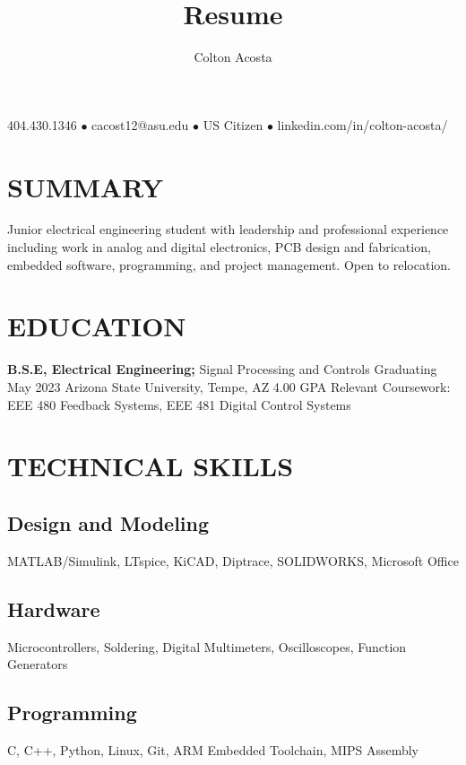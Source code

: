 \documentclass{article}
\makeatletter
\renewcommand{\maketitle}{
	\begin{center}
		{\huge\bfseries
			\theauthor}
			
		404.430.1346 $\bullet$ cacost12@asu.edu $\bullet$ US Citizen $\bullet$ linkedin.com/in/colton-acosta/
	\end{center}
}
\makeatother
\begin{document}
\title{Resume}
\author{Colton Acosta}
\maketitle
\section{SUMMARY}
Junior electrical engineering student with leadership and professional experience including work in analog and digital electronics, PCB design and fabrication, embedded software, programming, and project management. Open to relocation.

\section{EDUCATION}
\textbf{B.S.E, Electrical Engineering;} Signal Processing and Controls
\hfill 
Graduating May 2023
\linebreak
Arizona State University, Tempe, AZ 
\hfill
4.00 GPA
\linebreak
Relevant Coursework: EEE 480 Feedback Systems, EEE 481 Digital Control Systems

\section{TECHNICAL SKILLS}
\subsection{Design and Modeling}
MATLAB/Simulink, LTspice, KiCAD, Diptrace, SOLIDWORKS, Microsoft Office
\subsection{Hardware}
Microcontrollers, Soldering, Digital Multimeters, Oscilloscopes, Function Generators
\subsection{Programming} 
C, C++, Python, Linux, Git, ARM Embedded Toolchain, MIPS Assembly
\end{document}
